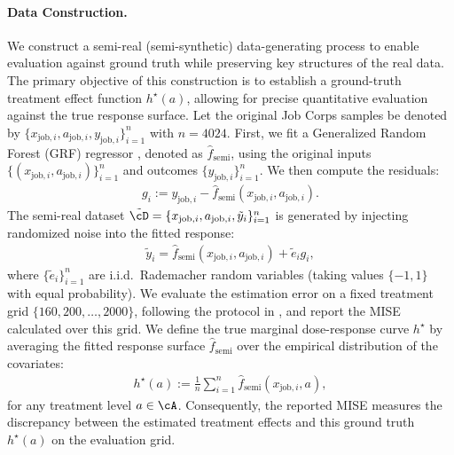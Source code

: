 \documentclass[english,11pt]{article}
\begin{document}
\paragraph{Data Construction.}
We construct a semi-real (semi-synthetic) data-generating process to enable evaluation against ground truth while preserving key structures of the real data.
The primary objective of this construction is to establish a ground-truth treatment effect function $h^\star(a)$, allowing for precise quantitative evaluation against the true response surface.
Let the original Job Corps samples be denoted by \(\{x_{\mathrm{job},i}, a_{\mathrm{job},i}, y_{\mathrm{job},i}\}_{i=1}^n\) with $n = 4024$.
First, we fit a Generalized Random Forest (GRF) regressor \citep{athey2019generalized}, denoted as \(\hat f_{\mathrm{semi}}\), using the original inputs \(\{(x_{\mathrm{job},i}, a_{\mathrm{job},i})\}_{i=1}^n\) and outcomes \(\{y_{\mathrm{job},i}\}_{i=1}^n\).
We then compute the residuals:
\begin{align*}
    g_i := y_{\mathrm{job},i} - \hat f_{\mathrm{semi}}(x_{\mathrm{job},i}, a_{\mathrm{job},i}).
\end{align*}
The semi-real dataset \(\tilde{\cD} = \{x_{\mathrm{job},i}, a_{\mathrm{job},i}, \tilde y_i\}_{i=1}^n\) is generated by injecting randomized noise into the fitted response:
\begin{align*}
    \tilde y_i = \hat f_{\mathrm{semi}}(x_{\mathrm{job},i}, a_{\mathrm{job},i}) + \tilde e_i g_i,
\end{align*}
where \(\{\tilde e_i\}_{i=1}^n\) are i.i.d.\ Rademacher random variables (taking values \(\{-1, 1\}\) with equal probability).
We evaluate the estimation error on a fixed treatment grid \(\{160, 200, \dots, 2000\}\), following the protocol in \citet{colangelo2025double}, and report the MISE calculated over this grid.
We define the true marginal dose-response curve $h^\star$ by averaging the fitted response surface $\hat{f}_{\mathrm{semi}}$ over the empirical distribution of the covariates:
\begin{align*}
    h^\star(a) := \frac{1}{n} \sum_{i=1}^n \hat{f}_{\mathrm{semi}}(x_{\mathrm{job},i}, a),
\end{align*}
for any treatment level $a \in \cA$. Consequently, the reported MISE measures the discrepancy between the estimated treatment effects and this ground truth $h^\star(a)$ on the evaluation grid.
\end{document}
